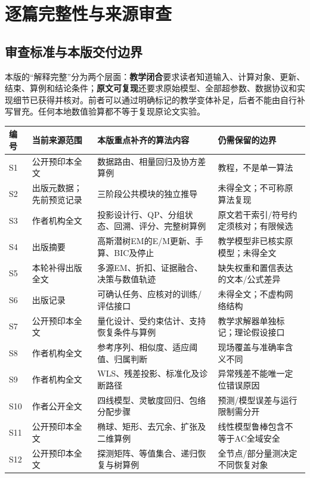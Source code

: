 \documentclass[UTF8,11pt,fontset=fandol,openany,oneside]{ctexbook}
\theoremstyle{definition}
\theoremstyle{remark}
\numberwithin{equation}{chapter}
\begin{document}

\appendix

\chapter{逐篇完整性与来源审查}
\label{app:audit}
\section{审查标准与本版交付边界}
本版的“解释完整”分为两个层面：\textbf{教学闭合}要求读者知道输入、计算对象、更新、结束、算例和结论条件；\textbf{原文可复现}还要求原始模型、全部超参数、数据协议和实现细节已获得并核对。前者可以通过明确标记的教学变体补足，后者不能由自行补写冒充。任何本地数值验算都不等于复现原论文实验。

\begin{longtable}{p{}p{}p{}p{}}
\toprule 编号 & 当前来源范围 & 本版重点补齐的算法内容 & 仍需保留的边界\\\midrule\endhead
S1 & 公开预印本全文 & 数据路由、相量回归及协方差算例 & 教程，不是单一算法\\
S2 & 出版元数据；先前预览记录 & 三阶段公共模块的独立推导 & 未得全文；不可称原算法复现\\
S3 & 作者机构全文 & 投影设计行、QP、分组状态、回溯、评分、完整树算例 & 原文若干索引/符号约定须核对；有限候选\\
S4 & 出版摘要 & 高斯潜树EM的E/M更新、手算、BIC及停止 & 教学模型非已核实原模型；未得全文\\
S5 & 本轮补得出版全文 & 多源EM、折扣、证据融合、决策与数值轨迹 & 缺失权重和置信表达的文本/公式差异\\
S6 & 出版记录 & 可确认任务、应核对的训练/评估接口 & 未得全文；不虚构网络结构\\
S7 & 公开预印本全文 & 量化设计、受约束估计、支持恢复条件与算例 & 教学求解器单独标记；理论假设接口\\
S8 & 作者机构全文 & 参考序列、相似度、适应阈值、归属判断 & 现场覆盖与准确率含义不同\\
S9 & 作者机构全文 & WLS、残差投影、标准化及诊断路径 & 异常残差不能唯一定位错误原因\\
S10 & 作者公开全文 & 四线模型、灵敏度回归、包络分配步骤 & 预测/模型误差与运行限制需分开\\
S11 & 公开预印本全文 & 椭球、矩形、去冗余、扩张及二维算例 & 线性模型鲁棒包含不等于AC全域安全\\
S12 & 公开预印本全文 & 探测矩阵、等值集合、递归恢复与树算例 & 全节点/部分量测决定不同恢复对象\\

\end{longtable}
\end{document}
